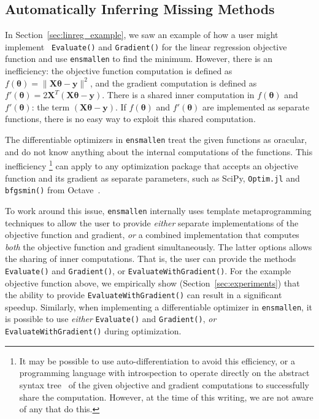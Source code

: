 \subsection{Automatically Inferring Missing Methods}
\label{sec:automatic}

In Section~\ref{sec:linreg_example}, we saw an example of how a user might implement {\tt
Evaluate()} and {\tt Gradient()} for the linear regression objective function
and use {\tt ensmallen} to find the minimum.
However, there is an inefficiency:
the objective function computation is defined as $f(\bm \theta) = \| \bm X \bm \theta - \bm y \|^2$,
and the gradient computation is defined as $f'(\bm \theta) = 2 \bm X^T (\bm X \bm \theta - \bm y)$.
There is a shared inner computation in $f(\bm \theta)$ and $f'(\bm \theta)$: the
term $(\bm X \bm \theta - \bm y)$.
If $f(\bm \theta)$ and $f'(\bm \theta)$ are implemented as separate functions,
there is no easy way to exploit this shared computation.

The differentiable optimizers in {\tt ensmallen} treat the given functions as oracular,
and do not know anything about the internal computations of the functions.
This inefficiency%
\footnote
  {It may be possible to use auto-differentiation to avoid this efficiency,
  or a programming language with introspection to operate directly on the
  abstract syntax tree~\cite{Jones_AST_2003} of the given objective and gradient
  computations to successfully share the computation.  However, at the time of
  this writing, we are not aware of any that do this.
  }
can apply to any optimization package that accepts an objective
function and its gradient as separate parameters,
such as SciPy, {\tt Optim.jl} and {\tt bfgsmin()} from Octave~\cite{octave}.

To work around this issue, {\tt ensmallen} internally uses template metaprogramming techniques to allow
the user to provide {\it either} separate implementations of the objective
function and gradient, {\it or} a combined implementation that computes {\it
both} the objective function and gradient simultaneously.
The latter options allows the sharing of inner computations.
That is, the user can provide the methods {\tt Evaluate()} and {\tt Gradient()},
or {\tt EvaluateWithGradient()}.
For the example objective function above,
we empirically show (Section~\ref{sec:experiments}) that the ability to provide
{\tt EvaluateWithGradient()} can result in a significant speedup.
Similarly, when implementing a differentiable optimizer in {\tt ensmallen},
it is possible to use {\it either} {\tt Evaluate()} and {\tt Gradient()},
{\it or} {\tt EvaluateWithGradient()} during optimization.

